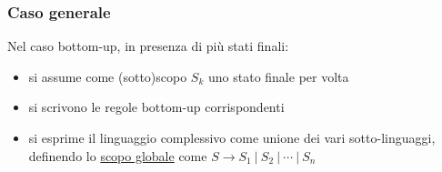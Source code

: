 \subsubsection{Caso generale}
Nel caso bottom-up, in presenza di più stati finali:
\begin{itemize}
    \item si assume come (sotto)scopo $S_k$ uno stato finale per volta
    \item si scrivono le regole bottom-up corrispondenti
    \item si esprime il linguaggio complessivo come unione dei vari sotto-linguaggi, definendo lo \underline{scopo globale} come $S \rightarrow S_1\ |\ S_2\ |\ \cdots\ |\ S_n$
\end{itemize}


